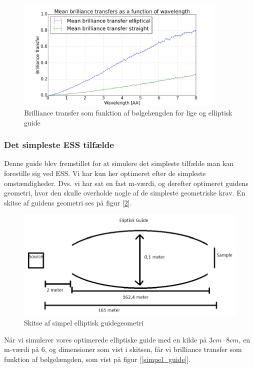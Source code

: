 \documentclass[12pt,oneside,a4paper]{article}
\begin{document}
{{{{{\begin{figure}[H]
\centering
\includegraphics[width=0.9\textwidth]{st_vs_elip_148950055477097.png}
\caption{Brilliance transfer som funktion af bølgelængden for lige og elliptisk guide} \label{st_vs_elip}
\end{figure}


\subsubsection{Det simpleste ESS tilfælde}
Denne guide blev fremstillet for at simulere det simpleste tilfælde man kan forestille sig ved ESS. Vi har kun her optimeret efter de simpleste omstændigheder. Dvs. vi har sat en fast m-værdi, og derefter optimeret guidens geometri, hvor den skulle overholde nogle af de simpleste geometriske krav.
En skitse af guidens geometri ses på figur [\ref{Ellipse}].

\begin{figure}[H]
\centering
\includegraphics[width=1\textwidth]{Elipse.png}
\caption{Skitse af simpel elliptisk guidegeometri} \label{Ellipse}
\end{figure}

Når vi simulerer vores optimerede elliptiske guide med en kilde på $3cm\cdot8cm$, en m-værdi på 6, og dimensioner som vist i skitsen, får vi brilliance transfer som funktion af bølgelængden, som vist på figur [\ref{simpel_guide}].

}}}}}
\end{document}
